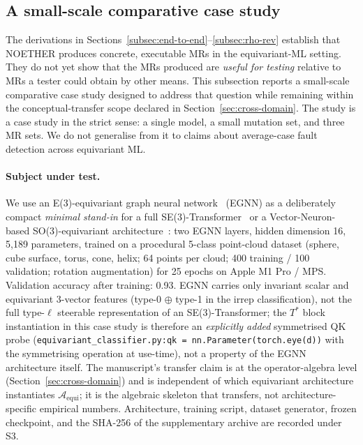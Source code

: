 \documentclass[acmsmall, screen]{acmart}
\begin{document}
\subsection{A small-scale comparative case study}
\label{subsec:case-study}

The derivations in Sections~\ref{subsec:end-to-end}--\ref{subsec:rho-rev} establish that NOETHER produces concrete, executable MRs in the equivariant-ML setting. They do not yet show that the MRs produced are \emph{useful for testing} relative to MRs a tester could obtain by other means. This subsection reports a small-scale comparative case study designed to address that question while remaining within the conceptual-transfer scope declared in Section~\ref{sec:cross-domain}. The study is a case study in the strict sense: a single model, a small mutation set, and three MR sets. We do not generalise from it to claims about average-case fault detection across equivariant ML.

\paragraph{Subject under test.}
We use an E(3)-equivariant graph neural network~\cite{Satorras2021EGNN} (EGNN) as a deliberately compact \emph{minimal stand-in} for a full SE(3)-Transformer~\cite{FuchsTransformer2020} or a Vector-Neuron-based SO(3)-equivariant architecture~\cite{Deng2021VectorNeurons}: two EGNN layers, hidden dimension 16, 5{,}189 parameters, trained on a procedural 5-class point-cloud dataset (sphere, cube surface, torus, cone, helix; 64 points per cloud; 400 training / 100 validation; rotation augmentation) for 25 epochs on Apple M1 Pro / MPS. Validation accuracy after training: 0.93. EGNN carries only invariant scalar and equivariant 3-vector features (type-0 $\oplus$ type-1 in the irrep classification), not the full type-$\ell$ steerable representation of an SE(3)-Transformer; the $T^*$ block instantiation in this case study is therefore an \emph{explicitly added} symmetrised QK probe (\texttt{equivariant\_classifier.py:qk = nn.Parameter(torch.eye(d))} with the symmetrising operation at use-time), not a property of the EGNN architecture itself. The manuscript's transfer claim is at the operator-algebra level (Section~\ref{sec:cross-domain}) and is independent of which equivariant architecture instantiates $\mathcal{A}_{\mathrm{equi}}$; it is the algebraic skeleton that transfers, not architecture-specific empirical numbers. Architecture, training script, dataset generator, frozen checkpoint, and the SHA-256 of the supplementary archive are recorded under S3.
\end{document}
